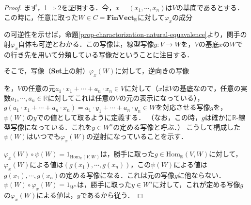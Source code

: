 \documentclass[uplatex, dvipdfmx]{jsreport}
\begin{document}
\begin{proof}
    まず，1$\Rightarrow$2を証明する．今，$x=(x_1,\cdots,x_n)$は$V$の基底であるとする．この時に，任意に取った$W\in C=\mathbf{FinVect}_\mathbb{R}$に対して$\varphi_x$の成分
    \begin{center}\end{center}
    の可逆性を示せば，命題\ref{prop-charactorization-natural-equavalence}より，関手の射$\varphi_x$自体も可逆とわかる．この写像は，線型写像$g:V\to W$を，$V$の基底$x$の$W$での行き先を用いて分類している写像だということに注目する．

    そこで，写像（\textbf{Set}上の射）$\varphi_x(W)$に対して，逆向きの写像
    \begin{center}\end{center}
    を，$V$の任意の元$a_1\cdot x_1+\cdots +a_n\cdot x_n\in V$に対して（$x$は$V$の基底なので，任意の実数$a_1,\cdots,a_n\in\mathbb{R}$に対してこれは任意の$V$の元の表示になっている），$g(a_1\cdot x_1+\cdots +a_n\cdot x_n)=a_1\cdot y_1+\cdots +a_n\cdot y_n\in W$を対応させる写像$g$を，$\psi(W)$の$y$での値として取るように定義する．
    （なお，この時，$g$は確かに$\mathbb{R}$-線型写像になっている．これを$y\in W^n$の定める写像と呼ぶ．）
    こうして構成した$\psi(W)$はいつでも$\varphi_x(W)$の逆射になっていることを示す．

    $\varphi_x(W)\circ \psi(W)=1_{\mathrm{Hom}_\mathbb{R}(V,W)}$は，勝手に取った$g\in\mathrm{Hom}_\mathbb{R}(V,W)$に対して，$\varphi_x(W)$による値は$\left( g(x_1),\cdots,g(x_n) \right)$，この$\psi(W)$による値は$g(x_1),\cdots,g(x_n)$の定める写像になる．これは元の写像$g$に他ならない．
    $\psi(W)\circ \varphi_x(W)=1_{W^n}$は，勝手に取った$y\in W^n$に対して，これが定める写像$g$の$\varphi_x(W)$による値は，$y$であるから従う．


\end{proof}
\end{document}
